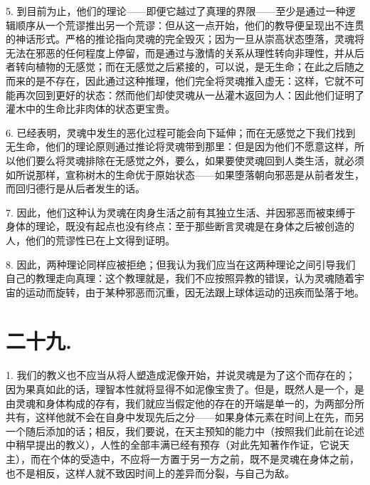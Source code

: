 5. 到目前为止，他们的理论——即便它越过了真理的界限——至少是通过一种逻辑顺序从一个荒谬推出另一个荒谬：但从这一点开始，他们的教导便呈现出不连贯的神话形式。严格的推论指向灵魂的完全毁灭；因为一旦从崇高状态堕落，灵魂将无法在邪恶的任何程度上停留，而是通过与激情的关系从理性转向非理性，并从后者转向植物的无感觉；而在无感觉之后紧接的，可以说，是无生命；在此之后随之而来的是不存在，因此通过这种推理，他们完全将灵魂推入虚无：这样，它就不可能再次回到更好的状态：然而他们却使灵魂从一丛灌木返回为人：因此他们证明了灌木中的生命比非肉体的状态更宝贵。\par

6. 已经表明，灵魂中发生的恶化过程可能会向下延伸；而在无感觉之下我们找到无生命，他们的理论原则通过推论将灵魂带到那里：但是因为他们不愿意这样，所以他们要么将灵魂排除在无感觉之外，要么，如果要使灵魂回到人类生活，就必须如所说那样，宣称树木的生命优于原始状态——如果堕落朝向邪恶是从前者发生，而回归德行是从后者发生的话。\par

7. 因此，他们这种认为灵魂在肉身生活之前有其独立生活、并因邪恶而被束缚于身体的理论，既没有起点也没有终点：至于那些断言灵魂是在身体之后被创造的人，他们的荒谬性已在上文得到证明。\par

8. 因此，两种理论同样应被拒绝；但我认为我们应当在这两种理论之间引导我们自己的教理走向真理：这个教理就是，我们不应按照异教的错误，认为灵魂随着宇宙的运动而旋转，由于某种邪恶而沉重，因无法跟上球体运动的迅疾而坠落于地。\par


\section{二十九. }

1. 我们的教义也不应当从将人塑造成泥像开始，并说灵魂是为了这个而存在的；因为果真如此的话，理智本性就将显得不如泥像宝贵了。但是，既然人是一个，是由灵魂和身体构成的存有，我们就应当假定他的存在的开端是单一的，为两部分所共有，这样他就不会在自身中发现先后之分——如果身体元素在时间上在先，而另一个随后添加的话；相反，我们要说，在天主预知的能力中（按照我们此前在论述中稍早提出的教义），人性的全部丰满已经有预存（对此先知著作作证，它说天主），而在个体的受造中，不应将一方置于另一方之前，既不是灵魂在身体之前，也不是相反，这样人就不致因时间上的差异而分裂，与自己为敌。\par


